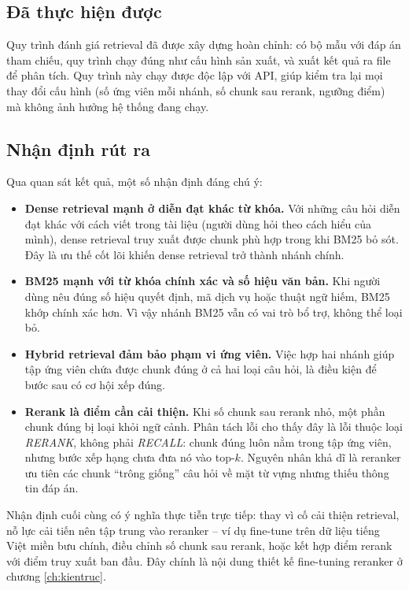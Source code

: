 \subsection{Đã thực hiện được}

Quy trình đánh giá retrieval đã được xây dựng hoàn chỉnh: có bộ mẫu với đáp án tham chiếu,
quy trình chạy đúng như cấu hình sản xuất, và xuất kết quả ra file để phân tích. Quy trình
này chạy được độc lập với API, giúp kiểm tra lại mọi thay đổi cấu hình (số ứng viên mỗi
nhánh, số chunk sau rerank, ngưỡng điểm) mà không ảnh hưởng hệ thống đang chạy.

\subsection{Nhận định rút ra}

Qua quan sát kết quả, một số nhận định đáng chú ý:

\begin{itemize}
  \item \textbf{Dense retrieval mạnh ở diễn đạt khác từ khóa.} Với những câu hỏi diễn đạt
  khác với cách viết trong tài liệu (người dùng hỏi theo cách hiểu của mình), dense
  retrieval truy xuất được chunk phù hợp trong khi BM25 bỏ sót. Đây là ưu thế cốt lõi
  khiến dense retrieval trở thành nhánh chính.
  \item \textbf{BM25 mạnh với từ khóa chính xác và số hiệu văn bản.} Khi người dùng nêu
  đúng số hiệu quyết định, mã dịch vụ hoặc thuật ngữ hiếm, BM25 khớp chính xác hơn.
  Vì vậy nhánh BM25 vẫn có vai trò bổ trợ, không thể loại bỏ.
  \item \textbf{Hybrid retrieval đảm bảo phạm vi ứng viên.} Việc hợp hai nhánh giúp tập
  ứng viên chứa được chunk đúng ở cả hai loại câu hỏi, là điều kiện để bước sau có cơ hội
  xếp đúng.
  \item \textbf{Rerank là điểm cần cải thiện.} Khi số chunk sau rerank nhỏ, một phần chunk
  đúng bị loại khỏi ngữ cảnh. Phân tách lỗi cho thấy đây là lỗi thuộc loại \emph{RERANK},
  không phải \emph{RECALL}: chunk đúng luôn nằm trong tập ứng viên, nhưng bước xếp hạng
  chưa đưa nó vào top-$k$. Nguyên nhân khả dĩ là reranker ưu tiên các chunk ``trông
  giống'' câu hỏi về mặt từ vựng nhưng thiếu thông tin đáp án.
\end{itemize}

Nhận định cuối cùng có ý nghĩa thực tiễn trực tiếp: thay vì cố cải thiện retrieval, nỗ lực
cải tiến nên tập trung vào reranker -- ví dụ fine-tune trên dữ liệu tiếng Việt miền bưu
chính, điều chỉnh số chunk sau rerank, hoặc kết hợp điểm rerank với điểm truy xuất ban
đầu. Đây chính là nội dung thiết kế fine-tuning reranker ở chương \ref{ch:kientruc}.

